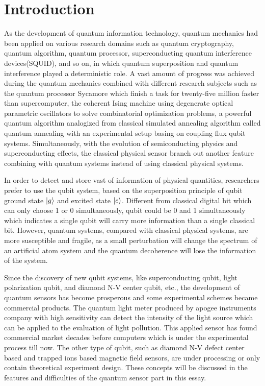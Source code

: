 \documentclass[11pt]{article}
\begin{document}
\section{Introduction}
As the development of quantum information technology, quantum mechanics had been applied on various research domains such as quantum cryptography, quantum algorithm, quantum processor, superconducting quantum interference devices(SQUID), and so on, in which quantum superposition and quantum interference played a deterministic role. A vast amount of progress was achieved during the quantum mechanics combined with different research subjects such as the quantum processor Sycamore which finish a task for twenty-five million faster than supercomputer\cite{arute2019quantum}, the coherent Ising machine using degenerate optical parametric oscillators to solve combinatorial optimization problems\cite{2016incoherent}, a powerful quantum algorithm analogized from classical simulated annealing algorithm\cite{kirkpatrick1983optimization} called quantum annealing with an experimental setup basing on coupling flux qubit systems\cite{johnson2011quantum}. Simultaneously, with the evolution of semiconducting physics and superconducting effects, the classical physical sensor branch out another feature combining with quantum systems instead of using classical physical systems.

In order to detect and store vast of information of physical quantities, researchers prefer to use the qubit system, based on the superposition principle of qubit ground state $\ket{g}$ and excited state $\ket{e}$. Different from classical digital bit which can only choose 1 or 0 simultaneously, qubit could be 0 and 1 simultaneously which indicates a single qubit will carry more information than a single classical bit. However, quantum systems, compared with classical physical systems, are more susceptible and fragile, as a small perturbation will change the spectrum of an artificial atom system and the quantum decoherence will lose the information of the system. 

Since the discovery of new qubit systems, like superconducting qubit, light polarization qubit, and diamond N-V center qubit, etc., the development of quantum sensors has become prosperous and some experimental schemes became commercial products. The quantum light meter produced by apogee instruments company with high sensitivity can detect the intensity of the light source which can be applied to the evaluation of light pollution. This applied sensor has found commercial market decades before computers which is under the experimental process till now. The other type of qubit, such as diamond N-V defect center\cite{lee2019ion} based and trapped ions\cite{matsuzaki2016hybrid} based magnetic field sensors, are under processing or only contain theoretical experiment design. These concepts will be discussed in the features and difficulties of the quantum sensor part in this essay.
\end{document}

